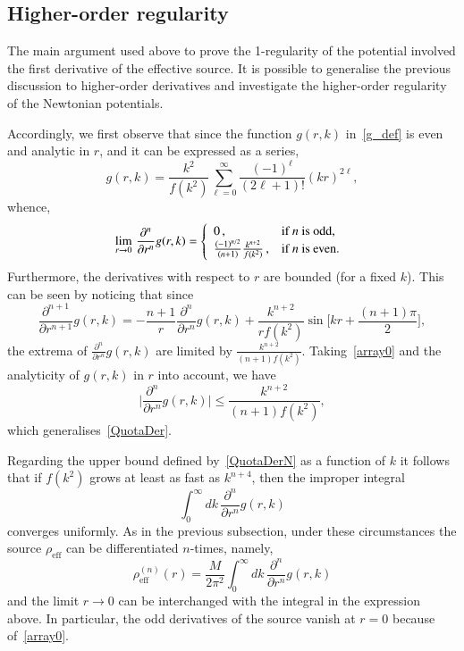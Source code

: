 \documentclass[aps,prd,a4paper,twocolumn,showpacs,showkeys,preprintnumbers,amsmath,amssymb,nofootinbib]{revtex4-2}
\numberwithin{equation}{section}
\def\beq{\begin{equation}}
\def\eeq{\end{equation}}
\def\pa{\partial}
\begin{document}


\subsection{Higher-order regularity}
\label{Sec5b}

The main argument used above to prove the 1-regularity of the potential involved the first derivative of the effective source. It is possible to generalise the previous discussion to higher-order derivatives and investigate the higher-order regularity of the Newtonian potentials.

Accordingly, we first observe that since the function $g(r,k)$ in~\eqref{g_def} is even and analytic in $r$, and it can be expressed as a series,
%
\begin{equation}
g(r,k) = \frac{k^2}{f(k^2)} \sum_{\ell=0}^\infty \frac{(-1)^\ell}{(2\ell + 1)!}  \left( kr \right)^{2\ell},
\end{equation}
whence,
\beq \label{array0}
\lim_{r \to 0} \, \frac{\partial^{n} }{\partial r^{n}} g(r,k)   =  \left\{ 
\begin{array}{l l}
0 \, ,  &  \text{if } n \text{ is odd},\\
\frac{(-1)^{n/2}}{(n + 1)} \frac{k^{n+2}}{f(k^2)}  \, , &  \text{if } n \text{ is even}.\\
\end{array} \right . \,
\eeq
%
Furthermore, the derivatives with respect to $r$ are bounded (for a fixed $k$). This can be seen by noticing that since
%
$$
\frac{\pa^{n+1}}{\pa r^{n+1}} g(r,k) = - \frac{n+1}{r} \frac{\pa^{n}}{\pa r^{n}} g(r,k) + \frac{k^{n+2}}{r f(k^2)} \sin \bigg[ kr + \frac{(n+1)\pi}{2}\bigg] ,
$$
%
the extrema of $\tfrac{\pa^{n}}{\pa r^{n}} g(r,k)$ are limited by $\tfrac{k^{n+2}}{(n+1)f(k^2)}$. Taking~\eqref{array0} and the analyticity of $g(r,k)$ in $r$ into account, we have
\begin{equation} \label{QuotaDerN}
\bigg\vert \frac{\pa^{n}}{\pa r^{n}} g(r,k) \bigg\vert \leqslant \frac{k^{n+2}}{(n+1)f(k^2)} ,
\end{equation}
which generalises~\eqref{QuotaDer}.

Regarding the upper bound defined by~\eqref{QuotaDerN} as a function of $k$ it follows that if $f(k^2)$ grows at least as fast as  $k^{n+4}$, then the improper integral
%
$$
\int_0^\infty dk \, \frac{\pa^n}{\pa r^n}g(r,k) 
$$
%
converges uniformly. As in the previous subsection, under these circumstances the source $\rho_{\text{eff}}$ can be differentiated $n$-times, namely,
\begin{equation} 
\rho_\text{eff}^{(n)}(r) = \frac{M}{2 \pi^2} \int_{0}^{\infty} dk \, \frac{\pa^n}{\pa r^n}g(r,k) 
\end{equation}
%
and the limit $r \to 0$ can be interchanged with the integral in the expression above. In particular,  the odd derivatives of the source vanish at $r=0$ because of~\eqref{array0}.
\end{document}
